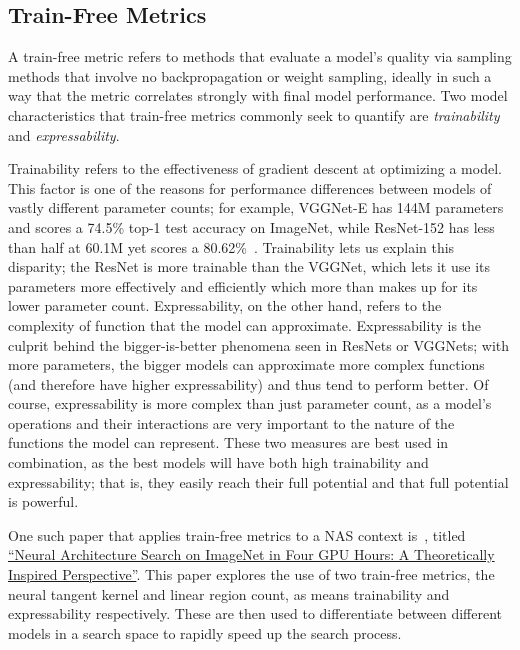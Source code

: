 \subsection{Train-Free Metrics}
A train-free metric refers to methods that evaluate a model's quality via sampling methods that involve
no backpropagation or weight sampling, ideally in such a way that the metric correlates strongly with final
model performance. Two model characteristics that train-free metrics commonly seek to quantify are
\textit{trainability} and \textit{expressability}.

Trainability refers to the effectiveness of gradient descent at optimizing
a model. This factor is one of the reasons for performance differences between models of vastly different parameter counts;
for example, VGGNet-E has 144M parameters and scores a 74.5\% top-1 test accuracy on ImageNet, while ResNet-152 has less
than half at 60.1M yet scores a 80.62\%~\citep{simon2014,he2015}. Trainability lets us explain this disparity; the
ResNet is more trainable than the VGGNet, which lets it use its parameters more effectively and efficiently which more
than makes up for its lower parameter count. Expressability, on the other hand, refers to the complexity of function that the model can approximate. Expressability
is the culprit behind the bigger-is-better phenomena seen in ResNets or VGGNets; with more parameters, the bigger models
can approximate more complex functions (and therefore have higher expressability) and thus tend to perform better. Of course,
expressability is more complex than just parameter count, as a model's operations and their interactions are very important to the
nature of the functions the model can represent. These two measures are best used in combination, as the best models
will have both high trainability and expressability; that is, they easily reach their full potential and that full potential is powerful.

One such paper that applies train-free metrics to a NAS context is~\cite{chen2021}, titled
\hyperlink{cite.chen2021}{``Neural Architecture Search on ImageNet in Four GPU Hours: A Theoretically Inspired Perspective''}. This paper explores
the use of two train-free metrics, the neural tangent kernel and linear region count,
as means trainability and expressability respectively. These are then used to differentiate between different models
in a search space to rapidly speed up the search process.


